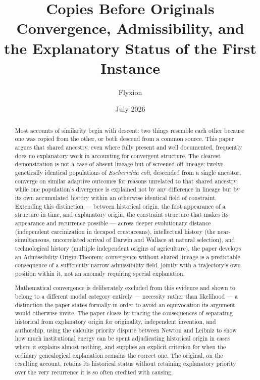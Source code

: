\documentclass[11pt]{article}
\title{\textbf{Copies Before Originals}\\[0.3em]
\large Convergence, Admissibility, and the Explanatory Status of the First Instance}
\author{Flyxion}
\date{July 2026}
\theoremstyle{plain}
\begin{document}
\maketitle

\begin{abstract}
\noindent
Most accounts of similarity begin with descent: two things resemble each other because one was copied from the other, or both descend from a common source. This paper argues that shared ancestry, even where fully present and well documented, frequently does no explanatory work in accounting for convergent structure. The clearest demonstration is not a case of absent lineage but of screened-off lineage: twelve genetically identical populations of \emph{Escherichia coli}, descended from a single ancestor, converge on similar adaptive outcomes for reasons unrelated to that shared ancestry, while one population's divergence is explained not by any difference in lineage but by its own accumulated history within an otherwise identical field of constraint. Extending this distinction --- between historical origin, the first appearance of a structure in time, and explanatory origin, the constraint structure that makes its appearance and recurrence possible --- across deeper evolutionary distance (independent carcinization in decapod crustaceans), intellectual history (the near-simultaneous, uncorrelated arrival of Darwin and Wallace at natural selection), and technological history (multiple independent origins of agriculture), the paper develops an Admissibility-Origin Theorem: convergence without shared lineage is a predictable consequence of a sufficiently narrow admissibility field, jointly with a trajectory's own position within it, not an anomaly requiring special explanation.

Mathematical convergence is deliberately excluded from this evidence and shown to belong to a different modal category entirely --- necessity rather than likelihood --- a distinction the paper states formally in order to avoid an equivocation its argument would otherwise invite. The paper closes by tracing the consequences of separating historical from explanatory origin for originality, independent invention, and authorship, using the calculus priority dispute between Newton and Leibniz to show how much institutional energy can be spent adjudicating historical origin in cases where it explains almost nothing, and supplies an explicit criterion for when the ordinary genealogical explanation remains the correct one. The original, on the resulting account, retains its historical status without retaining explanatory priority over the very recurrence it is so often credited with causing.



\end{abstract}
\end{document}
